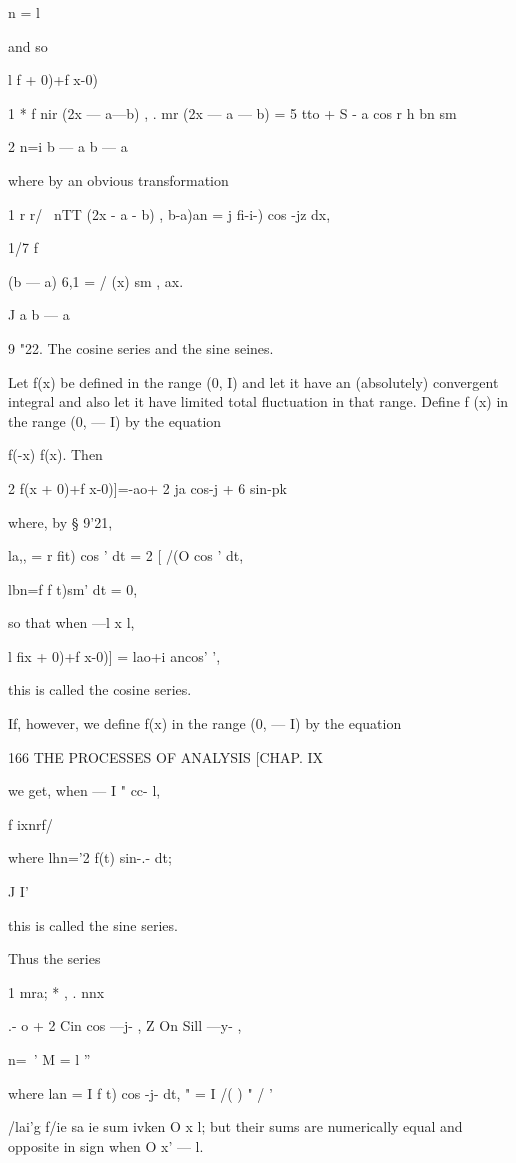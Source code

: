 n = l 

and so 

l f   + 0)+f x-0)  

1 * f nir (2x — a—b) , . mr (2x — a — b) 
= 5 tto + S -  a  cos r h bn sm 



2 n=i   b — a b — a 

where by an obvious transformation 

1 r r/ \ nTT (2x - a - b) , 
  b-a)an = j fi-i-) cos -jz  dx, 

1/7 \; f%

  (b — a) 6,1 = / (x) sm , ax. 

  J a b — a 

9 "22. The cosine series and the sine seines. 

Let f(x) be defined in the range (0, I) and let it have an (absolutely) 
convergent integral and also let it have limited total fluctuation in that range. 
Define f (x) in the range (0, — I) by the equation 

f(-x) f(x). 
Then 

2 f(x + 0)+f x-0)]=-ao+ 2 ja cos-j  + 6 sin-pk 

where, by § 9'21, 

la,, = r fit) cos '  dt = 2 [ /(O cos '  dt, 

lbn=f f t)sm' dt = 0, 

so that when —l x l, 

l fix + 0)+f x-0)] = lao+i ancos' ', 

this is called the cosine series. 

If, however, we define f(x) in the range (0, — I) by the equation 



166 THE PROCESSES OF ANALYSIS [CHAP. IX 

we get, when — I "  cc- l, 

f ixnrf/ 

where lhn='2 f(t) sin-.- dt; 

J I' 

this is called the sine series. 

Thus the series 

1   mra; * , . nnx 

.-  o + 2 Cin cos —j- , Z On Sill —y- , 

  n=\ '  M = l '' 

where  lan = I f t) cos -j- dt,   " = I /( )  "  /  ' 

/lai'g f/ie sa ie sum ivken O x  l; but their sums are numerically equal and 
opposite in sign when O x'  — l. 

